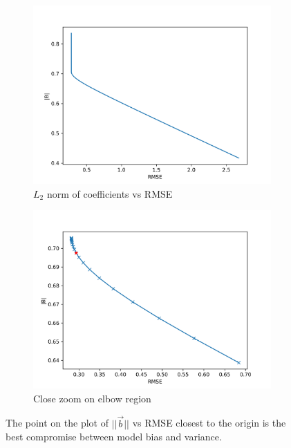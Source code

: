 \documentclass{IEEEtran}
\begin{document}
\begin{figure}
     \centering
     \begin{subfigure}[t]{0.24\textwidth}
         \centering
         \includegraphics[width=\textwidth]{norm_b_vs_rmse}
         \caption{$L_2$ norm of coefficients vs RMSE}
         \label{fig:y equals x}
     \end{subfigure}
     \hfill
     \begin{subfigure}[t]{0.24\textwidth}
         \centering
         \includegraphics[width=\textwidth]{norm_b_vs_rmse_zoomed}
         \caption{Close zoom on elbow region}
         \label{fig:three sin x}
     \end{subfigure}
     \hfill
     \caption{The point on the plot of $||\vec{b}||$ vs RMSE closest to the origin is the best compromise between
     		  model bias and variance.}
     \label{fig:norm_b_vs_rmse}
\end{figure}
\end{document}
